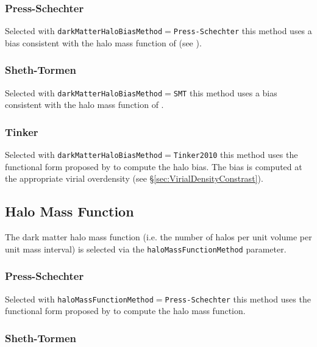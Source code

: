 \subsubsection{Press-Schechter}

Selected with {\tt darkMatterHaloBiasMethod}$=${\tt Press-Schechter} this method uses a bias consistent with the halo mass function of \cite{press_formation_1974} (see \citep{mo_analytic_1996}).

\subsubsection{Sheth-Tormen}

Selected with {\tt darkMatterHaloBiasMethod}$=${\tt SMT} this method uses a bias consistent with the halo mass function of \cite{sheth_ellipsoidal_2001}.

\subsubsection{Tinker}

Selected with {\tt darkMatterHaloBiasMethod}$=${\tt Tinker2010} this method uses the functional form proposed by \cite{tinker_large_2010} to compute the halo bias. The bias is computed at the appropriate virial overdensity (see \S\ref{sec:VirialDensityConstrast}).

\subsection{Halo Mass Function}

The dark matter halo mass function (i.e. the number of halos per unit volume per unit mass interval) is selected via the {\tt haloMassFunctionMethod} parameter.

\subsubsection{Press-Schechter}

Selected with {\tt haloMassFunctionMethod}$=${\tt Press-Schechter} this method uses the functional form proposed by \cite{press_formation_1974} to compute the halo mass function.

\subsubsection{Sheth-Tormen}

